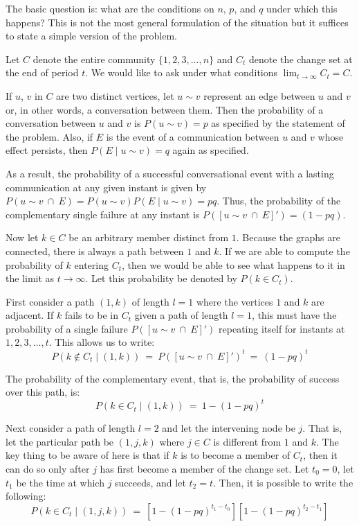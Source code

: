 The basic question is: what are the conditions on $n$, $p$, and $q$ under which this happens? This is not the most general formulation of the situation but it suffices to state a simple version of the problem.

Let $C$ denote the entire community $\{1, 2, 3, \ldots , n\}$ and $C_t$ denote the change set at the end of period $t$. We would like to ask under what conditions $\lim_{t \rightarrow \infty} C_t = C$.

If $u$, $v$ in $C$ are two distinct vertices, let $u \sim v$ represent an edge between $u$ and $v$ or, in other words, a conversation between them. Then the probability of a conversation between $u$ and $v$ is $P(u \sim v) = p$ as specified by the statement of the problem. Also, if $E$ is the event of a communication between $u$ and $v$ whose effect persists, then $P(E \mid u \sim v) = q$ again as specified. 

As a result, the probability of a successful conversational event with a lasting communication at any given instant is given by $P(u \sim v\ \cap\ E) = P(u \sim v)P(E \mid u \sim v) = pq$. Thus, the probability of the complementary single failure at any instant is $P([u \sim v\ \cap\ E]') = (1 - pq)$.

Now let $k \in C$ be an arbitrary member distinct from $1$. Because the graphs are connected, there is always a path between $1$ and $k$. If we are able to compute the probability of $k$ entering $C_t$, then we would be able to see what happens to it in the limit as $t \rightarrow \infty$. Let this probability be denoted by $P(k \in C_t)$. 

First consider a path $(1, k)$ of length $l = 1$ where the vertices $1$ and $k$ are adjacent. If $k$ fails to be in $C_t$ given a path of length $l = 1$, this must have the probability of a single failure $P([u \sim v\ \cap\ E]')$ repeating itself for instants at $1, 2, 3, \dots , t$. This allows us to write: \[ P(k \not\in C_t \mid (1, k))\ =\ P([u \sim v\ \cap\ E]')^t\ =\ (1 - pq)^t \]

The probability of the complementary event, that is, the probability of success over this path, is: \[ P(k \in C_t \mid (1, k))\ =\ 1 - (1 - pq)^t \]

Next consider a path of length $l = 2$ and let the intervening node be $j$. That is, let the particular path be $(1, j, k)$ where $j \in C$ is different from $1$ and $k$. The key thing to be aware of here is that if $k$ is to become a member of $C_t$, then it can do so only after $j$ has first become a member of the change set. Let $t_0 = 0$, let $t_1$ be the time at which $j$ succeeds, and let $t_2 = t$. Then, it is possible to write the following: \[ P(k \in C_t \mid (1, j, k))\ =\ [1 - (1 - pq)^{t_1 - t_0}][1 - (1 - pq)^{t_2 - t_1}] \]

